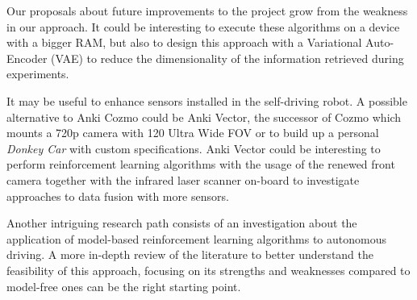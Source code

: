 \documentclass[10pt,twocolumn,letterpaper]{article}
\begin{document}
Our proposals about future improvements to the project grow from the weakness in our approach.
It could be interesting to execute these algorithms on a device with a bigger RAM, but also to design this approach with a Variational Auto-Encoder (VAE) to reduce the dimensionality of the information retrieved during experiments.

It may be useful to enhance sensors installed in the self-driving robot.
A possible alternative to Anki Cozmo could be Anki Vector, the successor of Cozmo which mounts a 720p camera with 120 Ultra Wide FOV or to build up a personal \textit{Donkey Car} with custom specifications.
Anki Vector could be interesting to perform reinforcement learning algorithms with the usage of the renewed front camera together with the infrared laser scanner on-board to investigate approaches to data fusion with more sensors.

Another intriguing research path consists of an investigation about the application of model-based reinforcement learning algorithms to autonomous driving.
A more in-depth review of the literature to better understand the feasibility of this approach, focusing on its strengths and weaknesses compared to model-free ones can be the right starting point.

{\footnotesize
    
    
}
\end{document}
